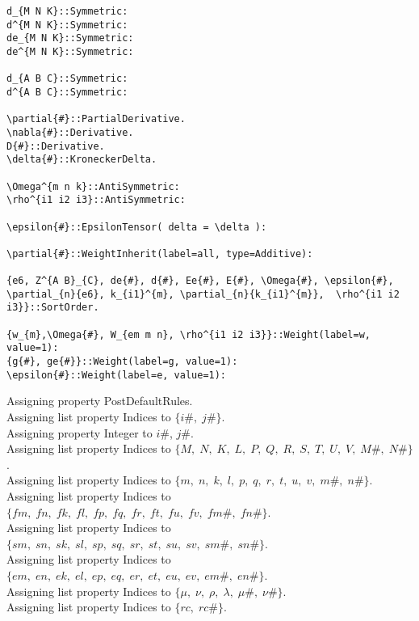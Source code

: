 \documentclass[11pt]{article}
\begin{document}
{\begin{verbatim}
d_{M N K}::Symmetric:
d^{M N K}::Symmetric:
de_{M N K}::Symmetric:
de^{M N K}::Symmetric:

d_{A B C}::Symmetric:
d^{A B C}::Symmetric:

\partial{#}::PartialDerivative.
\nabla{#}::Derivative.
D{#}::Derivative.
\delta{#}::KroneckerDelta.

\Omega^{m n k}::AntiSymmetric:
\rho^{i1 i2 i3}::AntiSymmetric:

\epsilon{#}::EpsilonTensor( delta = \delta ):

\partial{#}::WeightInherit(label=all, type=Additive):

{e6, Z^{A B}_{C}, de{#}, d{#}, Ee{#}, E{#}, \Omega{#}, \epsilon{#}, \partial_{n}{e6}, k_{i1}^{m}, \partial_{n}{k_{i1}^{m}},  \rho^{i1 i2 i3}}::SortOrder.

{w_{m},\Omega{#}, W_{em m n}, \rho^{i1 i2 i3}}::Weight(label=w, value=1):
{g{#}, ge{#}}::Weight(label=g, value=1):
\epsilon{#}::Weight(label=e, value=1):
\end{verbatim}}
Assigning property PostDefaultRules.
\\
Assigning list property Indices to $\{i\#,\; j\#\}$.
\\
Assigning property Integer to $i\#$, $j\#$.
\\
Assigning list property Indices to $\{M,\; N,\; K,\; L,\; P,\; Q,\; R,\; S,\; T,\; U,\; V,\; M\#,\; N\#\}$.
\\
Assigning list property Indices to $\{m,\; n,\; k,\; l,\; p,\; q,\; r,\; t,\; u,\; v,\; m\#,\; n\#\}$.
\\
Assigning list property Indices to $\{fm,\; fn,\; fk,\; fl,\; fp,\; fq,\; fr,\; ft,\; fu,\; fv,\; fm\#,\; fn\#\}$.
\\
Assigning list property Indices to $\{sm,\; sn,\; sk,\; sl,\; sp,\; sq,\; sr,\; st,\; su,\; sv,\; sm\#,\; sn\#\}$.
\\
Assigning list property Indices to $\{em,\; en,\; ek,\; el,\; ep,\; eq,\; er,\; et,\; eu,\; ev,\; em\#,\; en\#\}$.
\\
Assigning list property Indices to $\{\mu,\; \nu,\; \rho,\; \lambda,\; \mu\#,\; \nu\#\}$.
\\
Assigning list property Indices to $\{rc,\; rc\#\}$.
\end{document}
